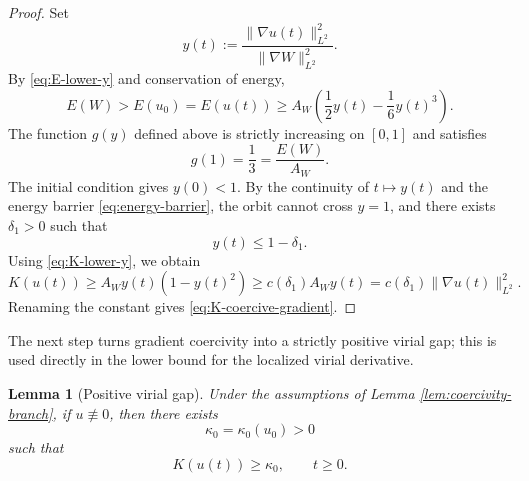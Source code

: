 \documentclass[10pt,a4paper]{amsart}
\numberwithin{equation}{section}
\newtheorem{lemma}[theorem]{Lemma}
\begin{document}
\begin{proof}
Set
\begin{equation*}
  y(t):=\frac{\|\nabla u(t)\|_{L^2}^2}{\|\nabla W\|_{L^2}^2}.
\end{equation*}
By \eqref{eq:E-lower-y} and conservation of energy,
\begin{equation}\label{eq:energy-barrier}
  E(W)>E(u_0)=E(u(t))
  \ge A_W\left(\frac12y(t)-\frac16y(t)^3\right).
\end{equation}
The function $g(y)$ defined above is strictly increasing on $[0,1]$ and satisfies
\begin{equation*}
  g(1)=\frac13=\frac{E(W)}{A_W}.
\end{equation*}
The initial condition gives $y(0)<1$. By the continuity of $t\mapsto y(t)$ and the energy barrier \eqref{eq:energy-barrier}, the orbit cannot cross $y=1$, and there exists $\delta_1>0$ such that
\begin{equation*}
  y(t)\le1-\delta_1.
\end{equation*}
Using \eqref{eq:K-lower-y}, we obtain
\begin{equation*}
  K(u(t))\ge A_Wy(t)(1-y(t)^2)
  \ge c(\delta_1)A_Wy(t)
  =c(\delta_1)\|\nabla u(t)\|_{L^2}^2.
\end{equation*}
Renaming the constant gives \eqref{eq:K-coercive-gradient}.
\end{proof}

The next step turns gradient coercivity into a strictly positive virial gap; this is used directly in the lower bound for the localized virial derivative.

\begin{lemma}[Positive virial gap]\label{lem:positive-K}
Under the assumptions of Lemma \ref{lem:coercivity-branch}, if $u\not\equiv0$, then there exists
\begin{equation*}
  \kappa_0=\kappa_0(u_0)>0
\end{equation*}
such that
\begin{equation}\label{eq:K-kappa0}
  K(u(t))\ge\kappa_0,
  \qquad t\ge0.
\end{equation}
\end{lemma}
\end{document}
